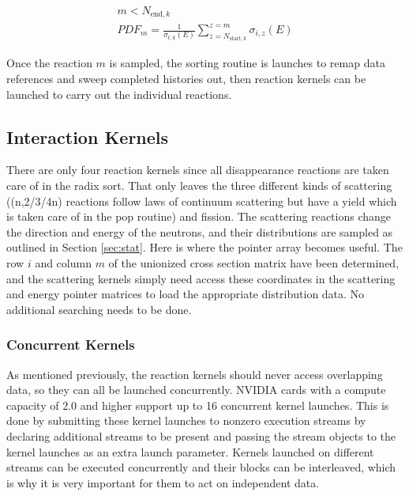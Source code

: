 \begin{equation}
\begin{gathered}
m <  N_{\mathrm{end},k}\\
 PDF_m = \frac{1}{\sigma_{t,k}(E)} \sum_{z=N_{\mathrm{start},k}}^{z=m}  \sigma_{i,z}(E)
 \end{gathered}
\label{micro_vector}
\end{equation}

Once the reaction $m$ is sampled, the sorting routine is launches to remap data references and sweep completed histories out, then reaction kernels can be launched to carry out the individual reactions.

\subsection{Interaction Kernels}

There are only four reaction kernels since all disappearance reactions are taken care of in the radix sort.  That only leaves the three different kinds of scattering ((n,2/3/4n) reactions follow laws of continuum scattering but have a yield which is taken care of in the pop routine) and fission.  The scattering reactions change the direction and energy of the neutrons, and their distributions are sampled as outlined in Section \ref{sec:stat}.  Here is where the pointer array becomes useful.  The row $i$ and column $m$ of the unionized cross section matrix have been determined, and the scattering kernels simply need access these coordinates in the scattering and energy pointer matrices to load the appropriate distribution data.  No additional searching needs to be done.

\subsubsection{Concurrent Kernels}

As mentioned previously, the reaction kernels should never access overlapping data, so they can all be launched concurrently.  NVIDIA cards with a compute capacity of 2.0 and higher support up to 16 concurrent kernel launches.  This is done by submitting these kernel launches to nonzero execution streams by declaring additional streams to be present and passing the stream objects to the kernel launches as an extra launch parameter.  Kernels launched on different streams can be executed concurrently and their blocks can be interleaved, which is why it is very important for them to act on independent data.

